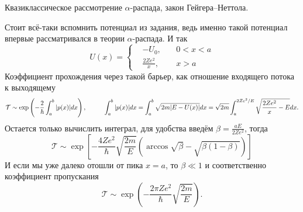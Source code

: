 \begin{leftrules}
	Квазиклассическое рассмотрение $\alpha$-распада, закон Гейгера–Неттола.
\end{leftrules}
Стоит всё-таки вспомнить потенциал из задания, ведь именно такой потенциал впервые рассматривался в теории $\alpha$-распада.
И так
\begin{equation*}
	U(x) = \left\{
	\begin{aligned}
		& - U_0, &\ &0<x<a\\
		& \tfrac{2 Z e^2}{x}, &\ &x > a
	\end{aligned}
	\right.
\end{equation*}
 Коэффициент прохождения через такой барьер, как отношение входящего потока к выходящему
 \begin{equation*}
 	\mathcal{T} \sim \exp \left( - \frac{2}{\hbar} \int_a^b |p(x)| d x \right),
 	\hspace{1 cm}
 	\int_{a}^{b} |p(x)| d x  = \int_a^b \sqrt{2m |E - U(x)|} d x = \sqrt{2 m} \int_{a}^{2 Ze^2/E} \sqrt{\frac{2 Z e^2}{x} - E} d x.
 \end{equation*}
 Остается только вычислить интеграл, для удобства введём $\beta = \frac{a E}{2 Z e^2}$, тогда
 \begin{equation*}
 	\mathcal{T} \sim \exp\left[- \frac{4 Z e^2}{\hbar} \sqrt{\frac{2 m}{E}} (\arccos \sqrt{\beta} - \sqrt{\beta(1-\beta)})\right]
 \end{equation*}
 И если мы уже далеко отошли от пика $x = a$, то $\beta \ll 1$ и соответственно коэффициент пропускания
 \begin{equation*}
 	\mathcal{T} \sim \exp\left(- \frac{2 \pi Z e^2}{\hbar} \sqrt{\frac{2m}{E}}\right).
 \end{equation*}

